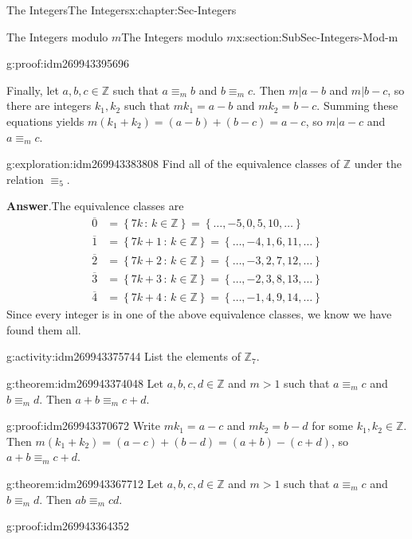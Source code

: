 \documentclass[oneside,10pt,]{book}
\numberwithin{equation}{section}
\newcommand{\set}[1]{\left\{ {#1} \right\}}
\newcommand{\setof}[2]{{\left\{#1\,\colon\,#2\right\}}}
\def\Z{{\mathbb Z}}
\newcommand{\amp}{&}
\begin{document}
\begin{chapterptx}{The Integers}{}{The Integers}{}{}{x:chapter:Sec-Integers}
\begin{sectionptx}{The Integers modulo \(m\)}{}{The Integers modulo \(m\)}{}{}{x:section:SubSec-Integers-Mod-m}
\begin{proofptx}{}{g:proof:idm269943395696}
\par
Finally, let \(a,b,c\in \Z\) such that \(a\equiv_m b\) and \(b\equiv_m c\). Then \(m|a-b\) and \(m|b-c\), so there are integers \(k_1, k_2\) such that \(m k_1 = a-b\) and \(m k_2 = b-c\). Summing these equations yields \(m(k_1 + k_2) = (a-b) + (b-c) = a-c\), so \(m|a-c\) and \(a\equiv_m c\).%
\end{proofptx}
\begin{exploration}{}{g:exploration:idm269943383808}%
Find all of the equivalence classes of \(\Z\) under the relation \(\equiv_5\).%
\par\smallskip%
\noindent\textbf{Answer}.\hypertarget{g:answer:idm269943381808}{}\quad{}The equivalence classes are%
\begin{align*}
\overline{0} \amp = \setof{7k}{k\in\Z} = \set{\ldots, -5, 0, 5, 10, \ldots}\\
\overline{1} \amp = \setof{7k+1}{k\in\Z} = \set{\ldots, -4, 1, 6, 11, \ldots}\\
\overline{2} \amp = \setof{7k+2}{k\in\Z} = \set{\ldots, -3, 2, 7, 12, \ldots}\\
\overline{3} \amp = \setof{7k+3}{k\in\Z} = \set{\ldots, -2, 3, 8, 13, \ldots}\\
\overline{4} \amp = \setof{7k+4}{k\in\Z} = \set{\ldots, -1, 4, 9, 14, \ldots}
\end{align*}
Since every integer is in one of the above equivalence classes, we know we have found them all.%
\end{exploration}
\label{g:notation:idm269943377856}%
\begin{activity}{}{g:activity:idm269943375744}%
List the elements of \(\Z_7\).%
\end{activity}
\begin{theorem}{}{}{g:theorem:idm269943374048}%
Let \(a,b, c,d\in \Z\) and \(m > 1\) such that \(a\equiv_m c\) and \(b\equiv_m d\). Then \(a+b \equiv_m c + d\).%
\end{theorem}
\begin{proofptx}{}{g:proof:idm269943370672}
Write \(mk_1 = a-c\) and \(m k_2 = b-d\) for some \(k_1,k_2\in \Z\). Then \(m(k_1 + k_2) = (a-c) + (b-d) = (a+b) - (c+d)\), so \(a+b \equiv_m c+d\).%
\end{proofptx}
\begin{theorem}{}{}{g:theorem:idm269943367712}%
Let \(a,b, c,d\in \Z\) and \(m > 1\) such that \(a\equiv_m c\) and \(b\equiv_m d\). Then \(ab \equiv_m c d\).%
\end{theorem}
\begin{proofptx}{}{g:proof:idm269943364352}

\end{proofptx}
\end{sectionptx}
\end{chapterptx}
\end{document}
